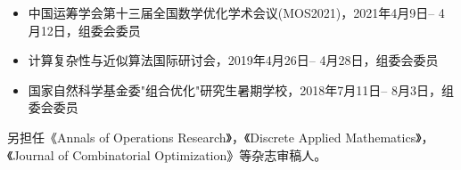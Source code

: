 %
%


{
\fontsize{9.65pt}{\baselineskip}\selectfont

\begin{itemize}[leftmargin=*]
	\item 中国运筹学会第十三届全国数学优化学术会议(MOS2021)，2021年4月9日-- 4月12日，组委会委员
	\item 计算复杂性与近似算法国际研讨会，2019年4月26日-- 4月28日，组委会委员
	\item 国家自然科学基金委"组合优化"研究生暑期学校，2018年7月11日-- 8月3日，组委会委员
\end{itemize}
}

另担任《Annals of Operations Research》，《Discrete Applied Mathematics》，《Journal of Combinatorial Optimization》等杂志审稿人。